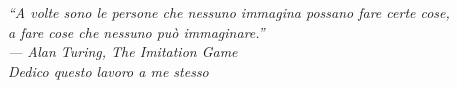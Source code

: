 \begin{dedication}
    \begin{flushright}
        {\small %
        \textit{``A volte sono le persone che nessuno immagina possano fare certe cose,\\
        a fare cose che nessuno può immaginare.'' \\ 
        --- Alan Turing, The Imitation Game \\[2em]
        \footnotesize Dedico questo lavoro a me stesso}}
    \end{flushright}
\end{dedication}